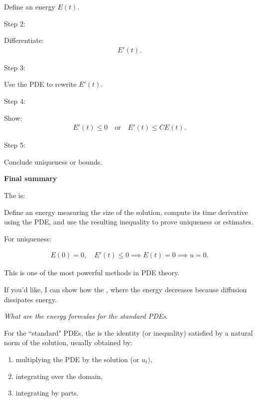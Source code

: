 \documentclass[12pt,a4paper]{report}
\begin{document}
\begin{description}
\begin{description}
\begin{description}
Define an energy $E(t)$.

    \item Step 2:

Differentiate:
\begin{align*}
E'(t).
\end{align*}

    \item Step 3:

Use the PDE to rewrite $E'(t)$.

    \item Step 4:

Show:
\begin{align*}
E'(t)\le 0
\quad\text{or}\quad
E'(t)\le CE(t).
\end{align*}

    \item Step 5:

Conclude uniqueness or bounds.

\end{description}

\item \textbf{Final summary}

The  is:

\> Define an energy measuring the size of the solution, compute its time derivative using the PDE, and use the resulting inequality to prove uniqueness or estimates.

For uniqueness:

\begin{align*}
E(0)=0,\quad E'(t)\le 0
\implies E(t)=0
\implies u=0.
\end{align*}

This is one of the most powerful methods in PDE theory.

\end{description}

If you'd like, I can show how the , where the energy decreases because diffusion dissipates energy.


\newpage
	\item \textit{What are the energy formulas for the standard PDEs}.


For the ``standard" PDEs, the  is the identity (or inequality) satisfied by a natural norm of the solution, usually obtained by:
\begin{enumerate}
\item multiplying the PDE by the solution (or $u_t)$,
\item integrating over the domain,
\item integrating by parts.
\end{enumerate}


\end{description}
\end{document}
